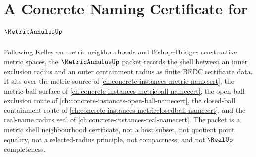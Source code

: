 \chapter{A Concrete Naming Certificate for $\MetricAnnulusUp$}
\label{ch:concrete-instances-metric-annulus-namecert}

Following Kelley on metric neighbourhoods and Bishop--Bridges constructive metric spaces, the $\MetricAnnulusUp$ packet records the shell between an inner exclusion radius and an outer containment radius as finite BEDC certificate data. It sits over the metric source of \autoref{ch:concrete-instances-metric-namecert}, the metric-ball surface of \autoref{ch:concrete-instances-metricball-namecert}, the open-ball exclusion route of \autoref{ch:concrete-instances-open-ball-namecert}, the closed-ball containment route of \autoref{ch:concrete-instances-metricclosedball-namecert}, and the real-name radius seal of \autoref{ch:concrete-instances-real-namecert}. The packet is a metric shell neighbourhood certificate, not a host subset, not quotient point equality, not a selected-radius principle, not compactness, and not $\RealUp$ completeness.


